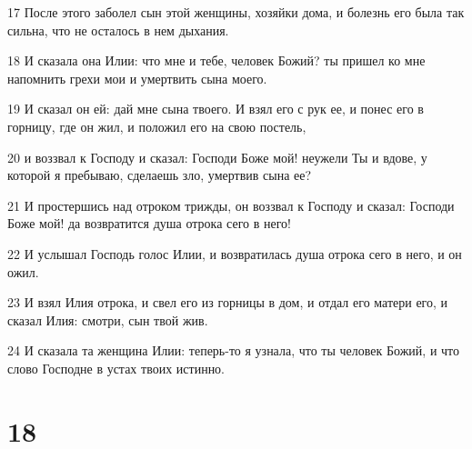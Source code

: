 \par 17 После этого заболел сын этой женщины, хозяйки дома, и болезнь его была так сильна, что не осталось в нем дыхания.
\par 18 И сказала она Илии: что мне и тебе, человек Божий? ты пришел ко мне напомнить грехи мои и умертвить сына моего.
\par 19 И сказал он ей: дай мне сына твоего. И взял его с рук ее, и понес его в горницу, где он жил, и положил его на свою постель,
\par 20 и воззвал к Господу и сказал: Господи Боже мой! неужели Ты и вдове, у которой я пребываю, сделаешь зло, умертвив сына ее?
\par 21 И простершись над отроком трижды, он воззвал к Господу и сказал: Господи Боже мой! да возвратится душа отрока сего в него!
\par 22 И услышал Господь голос Илии, и возвратилась душа отрока сего в него, и он ожил.
\par 23 И взял Илия отрока, и свел его из горницы в дом, и отдал его матери его, и сказал Илия: смотри, сын твой жив.
\par 24 И сказала та женщина Илии: теперь-то я узнала, что ты человек Божий, и что слово Господне в устах твоих истинно.

\chapter{18}

